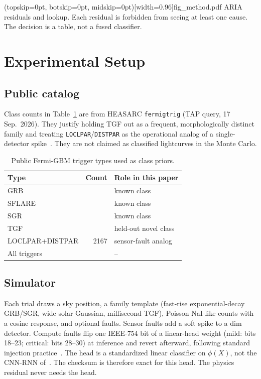 \documentclass{ieeeaccess}
\begin{document}
\Figure[!t](topskip=0pt, botskip=0pt, midskip=0pt)[width=0.96\textwidth]{fig_method.pdf}
{ARIA residuals and lookup. Each residual is forbidden from seeing at least one cause. The decision is a table, not a fused classifier.\label{fig:method}}

\section{Experimental Setup}

\subsection{Public catalog}
Class counts in Table~\ref{tab:cat} are from HEASARC \texttt{fermigtrig} (TAP query, 17 Sep.\ 2026). They justify holding TGF out as a frequent, morphologically distinct family and treating \texttt{LOCLPAR}/\texttt{DISTPAR} as the operational analog of a single-detector spike~\cite{goldstein2019}. They are not claimed as classified lightcurves in the Monte Carlo.

\begin{table}[!t]
\caption{Public Fermi-GBM trigger types used as class priors.}
\label{tab:cat}
\centering
\begin{tabular}{lrl}
\toprule
Type & Count & Role in this paper \\
\midrule
GRB & \CatalogGRB{} & known class \\
SFLARE & \CatalogSflare{} & known class \\
SGR & \CatalogSGR{} & known class \\
TGF & \CatalogTGF{} & held-out novel class \\
LOCLPAR+DISTPAR & 2167 & sensor-fault analog \\
All triggers & \CatalogTotal{} & -- \\
\bottomrule
\end{tabular}
\end{table}

\subsection{Simulator}
Each trial draws a sky position, a family template (fast-rise exponential-decay GRB/SGR, wide solar Gaussian, millisecond TGF), Poisson NaI-like counts with a cosine response, and optional faults. Sensor faults add a soft spike to a dim detector. Compute faults flip one IEEE-754 bit of a linear-head weight (mild: bits 18--23; critical: bits 28--30) at inference and revert afterward, following standard injection practice~\cite{pytorchfi2020}. The head is a standardized linear classifier on $\phi(X)$, not the CNN-RNN of~\cite{john2025}. The checksum is therefore exact for this head. The physics residual never needs the head.
\end{document}

